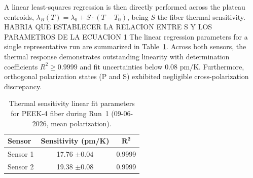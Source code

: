 \documentclass[preprint,11pt]{elsarticle}
\begin{document}
A linear least-squares regression is then directly performed across the plateau centroids, $\lambda_B(T) = \lambda_0 + S \cdot (T - T_0)$, being $S$ the fiber thermal sensitivity.  HABRIA QUE ESTABLECER LA RELACION ENTRE S Y LOS PARAMETROS DE LA ECUACION 1
The linear regression parameters for a single representative run are summarized in Table~\ref{tab:peek4_run1_summary}. Across both sensors, the thermal response demonstrates outstanding linearity with determination coefficients $R^2 \ge 0.9999$ and fit uncertainties below $0.08\text{ pm/K}$. Furthermore, orthogonal polarization states (P and S) exhibited negligible cross-polarization discrepancy. 


\begin{table}[htpb]
    \centering
    \caption{Thermal sensitivity linear fit parameters for PEEK-4 fiber during Run~1 (09-06-2026, mean polarization).}
    \label{tab:peek4_run1_summary}
    \begin{tabular}{lcc}
        \toprule
        \textbf{Sensor} & \textbf{Sensitivity (pm/K)} & $\mathbf{R^2}$ \\
        \midrule
        Sensor 1 & 17.76 $\pm 0.04$ & 0.9999 \\
        Sensor 2 & 19.38 $\pm 0.08$ & 0.9999 \\
        \bottomrule
    \end{tabular}
\end{table}



\end{document}
